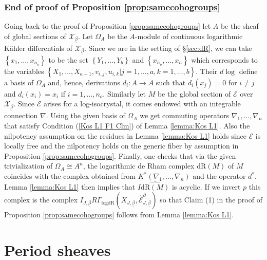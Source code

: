 \documentclass[asterisque,english]{smfart}
\begin{document}
\subsubsection{End of proof of Proposition \ref{prop:samecohogroups}}\label{section:incarnation} 
Going back to the proof of Proposition \ref{prop:samecohogroups} let $A$ be 
the sheaf of global sections of $\mathcal{X}_{
\underline{\beta }}$.  Let $\Omega_A $ be the $A$-module of continuous logarithmic  K\"{a}hler differentials of $\mathcal{X}_{\underline{\beta }}$.  Since we are in the setting of \S \ref{sec:dR}, we can take $
\left\{ x_{1},\ldots,x_{n_{o}}\right\} $ to be the set $\left\{
Y_1,\ldots, Y_b\right\} $ and $\left\{ x_{n_o},\ldots,x_n\right\}$ which corresponds to the variables  $\left\{X_1,\ldots,X_{a-1}, v_{i,j},u_{i,k}\vert j=1,\ldots,a, k=1,\ldots,b\right\}$. Their $d\log$ define a basis of $\Omega_A$ and, hence,  derivations $d_i\colon A \to A$ such that $d_i(x_j)=0$ for $i\neq j$ and $d_i(x_i)=x_i$ if $i=1,\ldots, n_o$. Similarly let $M$ be the global section of $\mathcal{E}$ over $\mathcal{X}_{
\underline{\beta }}$. Since $\mathcal{E}$ arises for a log-isocrystal, it comes endowed with an integrable connection $\nabla$. Using the given basis of $\Omega_A$ we get commuting operators $\nabla_1,\ldots,\nabla_n$ that satisfy Condition (\ref{Kos L1 F1 Clm}) of Lemma  \ref{lemma:Kos L1}. Also the nilpotency assumption on the residues in Lemma  \ref{lemma:Kos L1} holds since $\mathcal{E}$ is locally free and the nilpotency holds on the generic fiber by assumption in Proposition \ref{prop:samecohogroups}. Finally, one checks that via the given trivialization of $\Omega_A\cong A^n$, the logarithmic de Rham complex $\mathrm{dR}(M)$ of $M$ coincides with the complex obtained from $K^\ast\left( \nabla _{1},\ldots,\nabla _{n}\right)$ and the operator $d^\ast$.  Lemma \ref{lemma:Kos L1} then implies that $I\widehat{\mathrm{dR}(M)}$ is acyclic. If we invert $p$ this complex is the complex $I_{J,\underline{\beta }
}R\Gamma _{\mathrm{logdR}}\left( X_{J,\underline{\beta }},\widehat{\mathcal{E
}}_{J,\underline{\beta }}^{\partial }\right) $ so that Claim (1) in the proof of Proposition \ref{prop:samecohogroups} follows from Lemma  \ref{lemma:Kos L1}.






\section{Period sheaves}\label{sec:periodsheaves}
\end{document}
